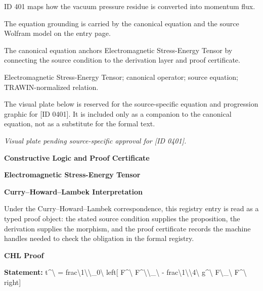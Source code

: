 ID 401 maps how the vacuum pressure residue is converted into momentum flux.

The equation grounding is carried by the canonical equation and the source Wolfram model on the entry page.

The canonical equation anchors Electromagnetic Stress-Energy Tensor by connecting the source condition to the derivation layer and proof certificate.

Electromagnetic Stress-Energy Tensor; canonical operator; source equation; TRAWIN-normalized relation.
\endgroup

\begingroup\footnotesize\sloppy
The visual plate below is reserved for the source-specific equation and progression graphic for [ID 0401]. It is included only as a companion to the canonical equation, not as a substitute for the formal text.
\par\endgroup
\begingroup\footnotesize\itshape
Visual plate pending source-specific approval for [ID 0401].
\par\endgroup

\clearpage
\begingroup\tzpsupportsetup
\noindent\textbf{\fontsize{10.8pt}{12.8pt}\selectfont [ID 0401] Constructive Logic and Proof Certificate}\par
\noindent\textbf{\fontsize{10pt}{12pt}\selectfont Electromagnetic Stress-Energy Tensor}\par
\vspace{0.45em}
\begingroup
\footnotesize
\setlength{\parskip}{0.22em}
\setlength{\parindent}{0pt}
\noindent\textbf{Curry--Howard--Lambek Interpretation}\par
Under the Curry--Howard--Lambek correspondence, this registry entry is read as a typed proof
object: the stated source condition supplies the proposition, the derivation supplies the
morphism, and the proof certificate records the machine handles needed to check the obligation
in the formal registry.

\vspace{0.45em}
\noindent\textbf{CHL Proof}\par
\textbf{Statement:} t\textasciicircum{}\textbackslash{} = frac\textbackslash{}1\textbackslash{}\textbackslash{}\_0\textbackslash{} left[ F\textasciicircum{}\textbackslash{} F\textasciicircum{}\textbackslash{}\textbackslash{}\_\textbackslash{} - frac\textbackslash{}1\textbackslash{}\textbackslash{}4\textbackslash{} g\textasciicircum{}\textbackslash{} F\textbackslash{}\_\textbackslash{} F\textasciicircum{}\textbackslash{} right]

